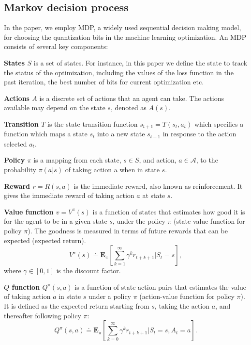 \documentclass[sigconf]{acmart}
\begin{document}
\subsection{Markov decision process}
In the paper, we employ MDP\cite{sutton1998reinforcement}, a widely used sequential decision making model, for choosing the quantization bits in the machine learning optimization. An MDP consists of several key components:

\textbf{States $S$} is a set of states. For instance, in this paper we define the state to track the status of the optimization, including the values of the loss function in the past iteration, the best number of bits for current optimization etc.

\textbf{Actions $A$} is a discrete set of actions that an agent can take. The actions available may depend on the state $s$, denoted as $A(s)$.

\textbf{Transition $T$} is the state transition function $s_{t+1} = T(s_t, a_t)$ which specifies a function which maps a state $s_t$ into a new state $s_{t+1}$ in response to the action selected $a_t$.

\textbf{Policy $\pi$} is a mapping from each state, $s\in S$, and action, $a\in \mathcal{A}$, to the probability $\pi(a|s)$ of taking action a when in state $s$.

\textbf{Reward $r=R(s, a)$} is the immediate reward, also known as reinforcement. It gives the immediate reward of taking action $a$ at state $s$. %

\textbf{Value function $v=V^\pi(s)$} is a function of states that estimates how good it is for the agent to be in a given state $s$, under the policy $\pi$ (state-value function for policy $\pi$). The goodness is measured in terms of future rewards that can be expected (expected return).%
\[
	V^\pi(s) \doteq \mathbf{E}_\pi \left[\sum_{k=1}^\infty \gamma^k r_{t+k+1} | S_t=s\right],
\]
where $\gamma\in[0,1]$ is the discount factor.

\textbf{$Q$ function $Q^\pi(s,a)$} is a function of state-action pairs that estimates the value of taking action $a$ in state $s$ under a policy $\pi$ (action-value function for policy $\pi$). It is defined as the expected return starting from $s$, taking the action $a$, and thereafter following policy $\pi$:
\[
	Q^\pi(s,a)\doteq \mathbf{E}_\pi\left[\sum_{k=0}^\infty\gamma^k r_{t+k+1}|S_t=s, A_t=a\right].
\]
\end{document}
